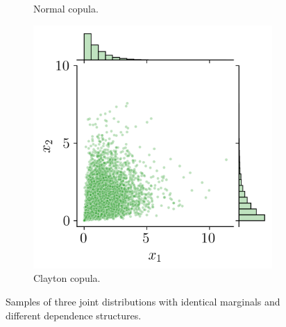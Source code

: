 \begin{figure}[ht]
\begin{subfigure}[b]{0.32\textwidth}
        \caption{Normal copula.}
    \end{subfigure}
    \hfill
    \begin{subfigure}[b]{0.32\textwidth}
        \centering
        \includegraphics[width=\textwidth]{../numerical_experiments/chapter1/figures/clayton_copula.png}
        \caption{Clayton copula.}
    \end{subfigure}
       \caption{Samples of three joint distributions with identical marginals and different dependence structures.}
       \label{fig:joint_dist_samples}
\end{figure}

